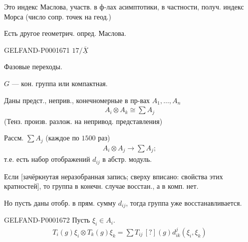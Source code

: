 Это индекс Маслова, участв. в ф-лах асимптотики,
в частности, получ. индекс Морса (число сопр. точек на геод.)

Есть другое геометрич. опред. Маслова.



\begin{GelfandAdjacentEvidence}{GELFAND-P000167}{1}
$17/\overline{\underline{X}}$ \quad {}\quad {}

Фазовые переходы.

\hfill{}


\quad {}

$G$ — кон. группа или компактная.


Даны предст., неприв., конечномерные в пр-вах $A_1,\ldots,A_n$
\begin{gather*}
A_i\otimes A_k\cong\sum A_j
\end{gather*}
(Тенз. произв. разлож. на непривод. представления)


Рассм. $\sum A_j$ (каждое по $1500$ раз)
\begin{gather*}
A_i\otimes A_j\longrightarrow\sum A_j;
\end{gather*}
т.е. есть набор отображений $d_{ij}$ в абстр. модуль.


Если [зачёркнутая неразобранная запись; сверху вписано: свойства этих кратностей], то группа в конечн. случае восстан., а в комп. нет.
\end{GelfandAdjacentEvidence}


Но пусть даны отобр. в прям. сумму $d_{ij}$, тогда группа уже восстанавливается.

\begin{GelfandAdjacentEvidence}{GELFAND-P000167}{2}
Пусть $\xi_i\in A_i$.
\begin{gather*}
T_i(g)\xi_i\otimes T_k(g)\xi_k
=\sum T_{ij}\,[?](g)d^j_{ik}(\xi_i,\xi_k)
\end{gather*}
\end{GelfandAdjacentEvidence}



